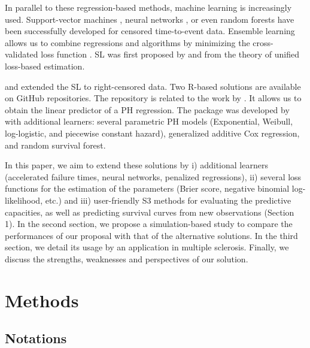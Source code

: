 In parallel to these regression-based methods, machine learning is increasingly used. Support-vector machines \citep{shivaswamySupportVectorApproach2007}, neural networks \citep{faraggiNeuralNetworkModel1995}, or even random forests \citep{ishwaranRandomSurvivalForests2008a} have been successfully developed for censored time-to-event data. Ensemble learning allows us to combine regressions and algorithms by minimizing the cross-validated loss function \citep{breimanStackedRegressions1996}. SL was first proposed by \citet{vanderlaanSuperLearner2007} and \citet{vanderlaandudoit2003} from the theory of unified loss-based estimation.

\citet{polleyChapterSuperLearning2011} and \citet{polleyChapter16Super2011} extended the SL to right-censored data. Two \textsf{R}-based solutions are available on GitHub repositories. The  repository is related to the work by \citet{golmakaniSuperLearnerSurvival2020a}. It allows us to obtain the linear predictor of a PH regression. The  package was developed by \citet{westlingPkgsurvSuperLearnerSuperLearning2021} with additional learners: several parametric PH models (Exponential, Weibull, log-logistic, and piecewise constant hazard), generalized additive Cox regression, and random survival forest.

In this paper, we aim to extend these solutions by i) additional learners (accelerated failure times, neural networks, penalized regressions), ii) several loss functions for the estimation of the parameters (Brier score, negative binomial log-likelihood, etc.) and iii) user-friendly S3 methods for evaluating the predictive capacities, as well as predicting survival curves from new observations (Section 1). In the second section, we propose a simulation-based study to compare the performances of our proposal with that of the alternative solutions. In the third section, we detail its usage by an application in multiple sclerosis. Finally, we discuss the strengths, weaknesses and perspectives of our solution.

\hypertarget{methods}{%
\section{Methods}\label{methods}}

\hypertarget{notations}{%
\subsection{Notations}\label{notations}}

